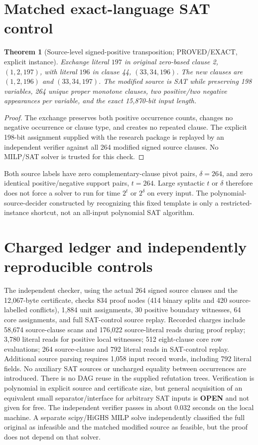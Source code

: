\documentclass[11pt]{article}
\newtheorem{theorem}{Theorem}
\begin{document}
\section{Matched exact-language SAT control}
\begin{theorem}[Source-level signed-positive transposition; PROVED/EXACT, explicit instance]
Exchange literal $197$ in original zero-based clause 2, $(1,2,197)$, with literal $196$ in clause 44, $(33,34,196)$. The new clauses are $(1,2,196)$ and $(33,34,197)$. The modified source is SAT while preserving 198 variables, 264 unique proper monotone clauses, two positive/two negative appearances per variable, and the exact 15,870-bit input length.
\end{theorem}
\begin{proof}
The exchange preserves both positive occurrence counts, changes no negative occurrence or clause type, and creates no repeated clause. The explicit 198-bit assignment supplied with the research package is replayed by an independent verifier against all 264 modified signed source clauses. No MILP/SAT solver is trusted for this check.
\end{proof}
Both source labels have zero complementary-clause pivot pairs, $\delta=264$, and zero identical positive/negative support pairs, $t=264$. Large syntactic $t$ or $\delta$ therefore does not force a solver to run for time $2^t$ or $2^\delta$ on every input. The polynomial-source-decider constructed by recognizing this fixed template is only a restricted-instance shortcut, not an all-input polynomial SAT algorithm.

\section{Charged ledger and independently reproducible controls}
The independent checker, using the actual 264 signed source clauses and the 12,067-byte certificate, checks 834 proof nodes (414 binary splits and 420 source-labelled conflicts), 1,884 unit assignments, 30 positive boundary witnesses, 64 core assignments, and full SAT-control source replay. Recorded charges include 58,674 source-clause scans and 176,022 source-literal reads during proof replay; 3,780 literal reads for positive local witnesses; 512 eight-clause core row evaluations; 264 source-clause and 792 literal reads in SAT-control replay. Additional source parsing requires 1,058 input record words, including 792 literal fields. No auxiliary SAT sources or uncharged equality between occurrences are introduced. There is no DAG reuse in the supplied refutation trees. Verification is polynomial in explicit source and certificate size, but general acquisition of an equivalent small separator/interface for arbitrary SAT inputs is \textbf{OPEN} and not given for free. The independent verifier passes in about 0.032 seconds on the local machine. A separate scipy/HiGHS MILP solve independently classified the full original as infeasible and the matched modified source as feasible, but the proof does not depend on that solver.
\end{document}
